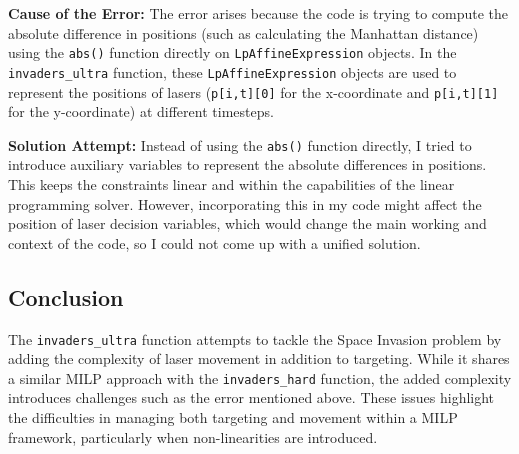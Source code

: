 \documentclass[12pt]{article}
\begin{document}
\textbf{Cause of the Error:} The error arises because the code is trying to compute the absolute difference in positions (such as calculating the Manhattan distance) using the \texttt{abs()} function directly on \texttt{LpAffineExpression} objects. In the \texttt{invaders\_ultra} function, these \texttt{LpAffineExpression} objects are used to represent the positions of lasers (\texttt{p[i,t][0]} for the x-coordinate and \texttt{p[i,t][1]} for the y-coordinate) at different timesteps.

\textbf{Solution Attempt:} Instead of using the \texttt{abs()} function directly, I tried to introduce auxiliary variables to represent the absolute differences in positions. This keeps the constraints linear and within the capabilities of the linear programming solver. However, incorporating this in my code might affect the position of laser decision variables, which would change the main working and context of the code, so I could not come up with a unified solution.

\subsection{Conclusion}
The \texttt{invaders\_ultra} function attempts to tackle the Space Invasion problem by adding the complexity of laser movement in addition to targeting. While it shares a similar MILP approach with the \texttt{invaders\_hard} function, the added complexity introduces challenges such as the error mentioned above. These issues highlight the difficulties in managing both targeting and movement within a MILP framework, particularly when non-linearities are introduced.
\end{document}
